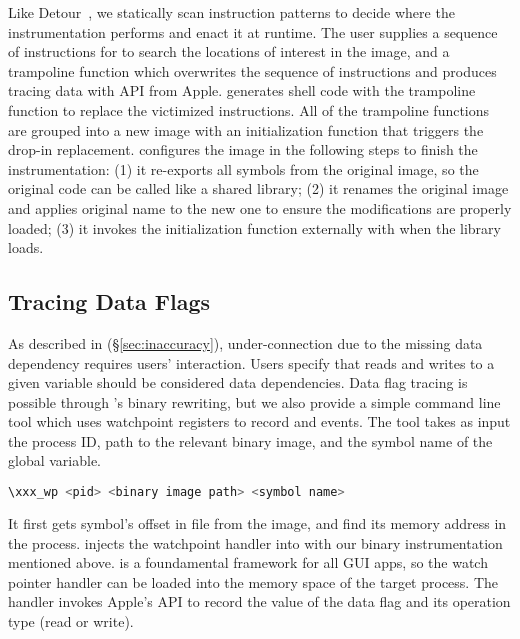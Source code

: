 Like Detour~\cite{hunt1999detours}, we statically scan instruction patterns
to decide where the instrumentation performs and enact it at runtime. The
user supplies a sequence of instructions for \xxx to search the locations of
interest in the image, and a trampoline function which overwrites the sequence
of instructions and produces tracing data with API  from
Apple. \xxx generates shell code with the trampoline function to replace the
victimized instructions. All of the trampoline functions are grouped into a new
image with an initialization function that triggers the drop-in replacement.
\xxx configures the image in the following steps to finish the instrumentation:
(1) it re-exports all symbols from the original image, so the original code can
be called like a shared library; (2) it renames the original image and applies
original name to the new one to ensure the modifications are properly loaded;
(3) it invokes the initialization function externally with 
when the library loads.

\subsection{Tracing Data Flags} \label{subsec:tcp}

As described in (\S\ref{sec:inaccuracy}), under-connection due to the missing
data dependency requires users' interaction. Users specify that reads and writes
to a given variable should be considered data dependencies. Data flag tracing
is possible through \xxx's binary rewriting, but we also provide a simple
command line tool which uses watchpoint registers to record \dataflagwrite and
\dataflagread events. The tool  takes as input the process ID,
path to the relevant binary image, and the symbol name of the global variable.

\begin{lstlisting}[language=c++,numbers=none]
\xxx_wp <pid> <binary image path> <symbol name>
\end{lstlisting}

\noindent It first gets symbol's offset in file from the image, and find
its memory address in the process. \xxx injects the watchpoint handler
into  with our binary instrumentation mentioned above.
 is a foundamental framework for all GUI apps, so the watch
pointer handler can be loaded into the memory space of the target process. The
handler invokes Apple's API  to record the value of the data
flag and its operation type (read or write).

